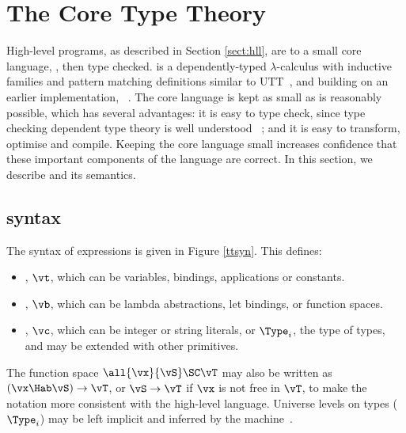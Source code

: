 \section{The Core Type Theory}

\label{sect:typechecking}

High-level \Idris{} programs, as described in Section \ref{sect:hll}, are 
 to a small core language, \TT{}, then type checked. 
\TT{} is a dependently-typed $\lambda$-calculus with inductive families
and pattern matching definitions similar to UTT~\cite{luo1994}, and building
on an earlier implementation, \Ivor{}~\cite{Brady2006b}.
The
core language is kept as small as is reasonably possible, which has several advantages: it is
easy to type check, since type checking dependent type theory is well understood
~\cite{loh2010tutorial}; and it is easy to transform, optimise and compile. Keeping
the core language small increases confidence that these important components of
the language are correct. In this section, we describe \TT{} and
its semantics.

\subsection{\TT{} syntax}

The syntax of \TT{} expressions is given in Figure \ref{ttsyn}. This defines:

\begin{itemize}
\item {}, $\vt$, which can be variables, bindings, applications or constants.
\item {}, $\vb$, which can be lambda abstractions, let bindings, or function spaces.
\item {}, $\vc$, which can be integer or string literals, or $\Type_i$, the
type of types, and may be extended with other primitives. 
\end{itemize}

The function space $\all{\vx}{\vS}\SC\vT$ may also be written as $(\vx\Hab\vS)\to\vT$,
or $\vS\to\vT$ if $\vx$ is not free in $\vT$, to make the notation more consistent with
the high-level language. Universe levels on types ($\Type_i$) may be left implicit and
inferred by the machine~\cite{pollack1990implicit}.

